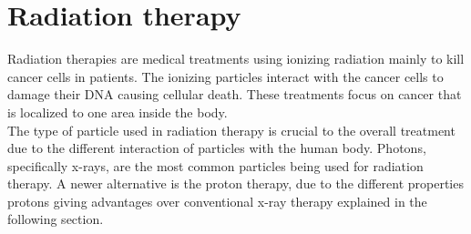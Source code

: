 %
%

\chapter{Radiation therapy}
Radiation therapies are medical treatments using ionizing radiation mainly to kill cancer cells in patients. The ionizing particles interact with the
cancer cells to damage their DNA causing cellular death. These treatments focus on cancer that is localized to one area inside the body. \\
The type of particle used in radiation therapy is crucial to the overall treatment due to the different interaction of particles with the human body.
Photons, specifically x-rays, are the most common particles being used for radiation therapy.
A newer alternative is the proton therapy, due to the different properties protons giving advantages over conventional x-ray therapy explained in the following section.

